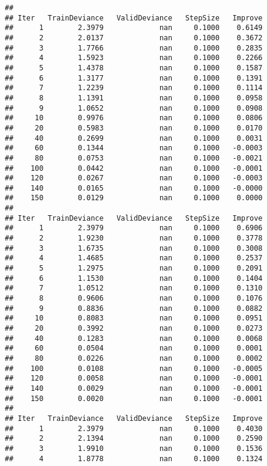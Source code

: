 \documentclass[]{article}
\begin{document}
\begin{verbatim}
## 
## Iter   TrainDeviance   ValidDeviance   StepSize   Improve
##      1        2.3979             nan     0.1000    0.6149
##      2        2.0137             nan     0.1000    0.3672
##      3        1.7766             nan     0.1000    0.2835
##      4        1.5923             nan     0.1000    0.2266
##      5        1.4378             nan     0.1000    0.1587
##      6        1.3177             nan     0.1000    0.1391
##      7        1.2239             nan     0.1000    0.1114
##      8        1.1391             nan     0.1000    0.0958
##      9        1.0652             nan     0.1000    0.0908
##     10        0.9976             nan     0.1000    0.0806
##     20        0.5983             nan     0.1000    0.0170
##     40        0.2699             nan     0.1000    0.0031
##     60        0.1344             nan     0.1000   -0.0003
##     80        0.0753             nan     0.1000   -0.0021
##    100        0.0442             nan     0.1000   -0.0001
##    120        0.0267             nan     0.1000   -0.0003
##    140        0.0165             nan     0.1000   -0.0000
##    150        0.0129             nan     0.1000    0.0000
## 
## Iter   TrainDeviance   ValidDeviance   StepSize   Improve
##      1        2.3979             nan     0.1000    0.6906
##      2        1.9230             nan     0.1000    0.3778
##      3        1.6735             nan     0.1000    0.3008
##      4        1.4685             nan     0.1000    0.2537
##      5        1.2975             nan     0.1000    0.2091
##      6        1.1530             nan     0.1000    0.1404
##      7        1.0512             nan     0.1000    0.1310
##      8        0.9606             nan     0.1000    0.1076
##      9        0.8836             nan     0.1000    0.0882
##     10        0.8083             nan     0.1000    0.0951
##     20        0.3992             nan     0.1000    0.0273
##     40        0.1283             nan     0.1000    0.0068
##     60        0.0504             nan     0.1000    0.0001
##     80        0.0226             nan     0.1000    0.0002
##    100        0.0108             nan     0.1000   -0.0005
##    120        0.0058             nan     0.1000   -0.0001
##    140        0.0029             nan     0.1000   -0.0001
##    150        0.0020             nan     0.1000   -0.0001
## 
## Iter   TrainDeviance   ValidDeviance   StepSize   Improve
##      1        2.3979             nan     0.1000    0.4030
##      2        2.1394             nan     0.1000    0.2590
##      3        1.9910             nan     0.1000    0.1536
##      4        1.8778             nan     0.1000    0.1324

\end{verbatim}
\end{document}
